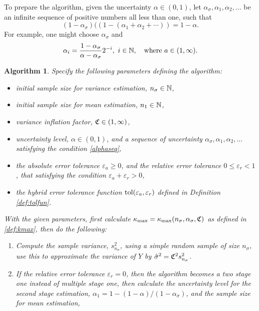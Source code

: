 \documentclass{iitthesis}
\newtheorem{algorithm}[theorem]{Algorithm}
\begin{document}
To prepare the algorithm, given the uncertainty $\alpha \in (0,1)$, let $\alpha_{\sigma}, \alpha_1,  \alpha_2, \ldots$ be an infinite sequence of positive numbers all less than one, such that 
\begin{equation} \label{alphaseq}
(1-\alpha_{\sigma})((1-(\alpha_1+\alpha_2+\cdots)) = 1-\alpha.
\end{equation}
For example, one might choose $\alpha_{\sigma}$ and 
\begin{equation} \label{alphaseqex}
\alpha_{i} = \frac{1-\alpha_\sigma}{\alpha-\alpha_\sigma} 2^{-i}, \ i\in \mathbb{N}, \quad \text{where} \  a \in (1,\infty).
\end{equation}
\begin{algorithm}\label{alg:meanMCg} 
Specify the following parameters defining the algorithm:
\begin{itemize}
\item initial sample size for variance estimation, $n_{\sigma} \in \mathbb{N}$,
\item initial sample size for mean estimation, $n_1 \in \mathbb{N}$,
\item variance inflation factor, $\mathfrak{C} \in (1,\infty)$, 
\item uncertainty level, $\alpha\in (0,1)$, and a sequence of uncertainty $ \alpha_\sigma, \alpha_1,  \alpha_2, \ldots$ satisfying the condition \eqref{alphaseq}, 
\item the absolute error tolerance $\varepsilon_a \geq 0$, and the relative error tolerance $0 \leq \varepsilon_r <1$, that satisfying the condition $\varepsilon_a+\varepsilon_r >0$,
\item the hybrid error tolerance function $\operatorname{tol}(\varepsilon_a,\varepsilon_r)$ defined in Definition \ref{def:tolfun}.
\end{itemize} 
With the given parameters, first calculate $\kappa_{\max}=\kappa_{\max}(n_\sigma,\alpha_\sigma,\mathfrak{C})$ as defined in \eqref{def:kmax}, then do the following:
\begin{enumerate}
\item Compute the sample variance, $s^2_{n_{\sigma}}$, using a simple random sample of size $n_\sigma$, use this to approximate the variance of $Y$ by $\hat{\sigma}^2 = \mathfrak{C}^2 s^2_{n_\sigma}$. 
\item If the relative error tolerance $\varepsilon_r=0$, then the algorithm becomes a two stage one instead of multiple stage one, then calculate the uncertainty level for the second stage estimation, $\alpha_1 = 1-(1-\alpha)/(1-\alpha_\sigma)$, and the sample size for mean estimation,

\end{enumerate}
\end{algorithm}
\end{document}
